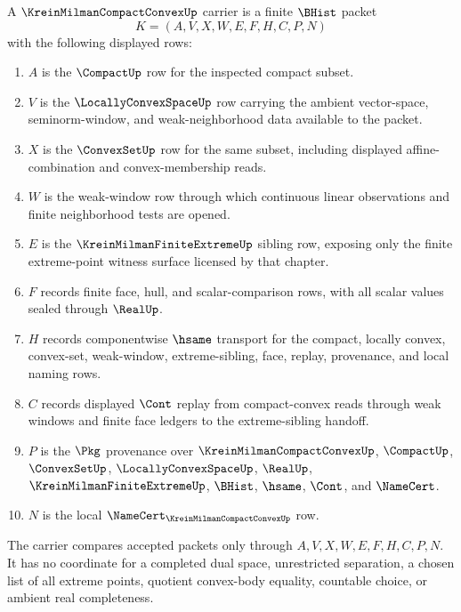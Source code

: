 \begin{definition}
\label{def:krein-milman-compact-convex-carrier}
A $\KreinMilmanCompactConvexUp$ carrier is a finite $\BHist$ packet
$$
K=(A,V,X,W,E,F,H,C,P,N)
$$
with the following displayed rows:
\begin{enumerate}
\item $A$ is the $\CompactUp$ row for the inspected compact subset.
\item $V$ is the $\LocallyConvexSpaceUp$ row carrying the ambient vector-space, seminorm-window, and weak-neighborhood data available to the packet.
\item $X$ is the $\ConvexSetUp$ row for the same subset, including displayed affine-combination and convex-membership reads.
\item $W$ is the weak-window row through which continuous linear observations and finite neighborhood tests are opened.
\item $E$ is the $\KreinMilmanFiniteExtremeUp$ sibling row, exposing only the finite extreme-point witness surface licensed by that chapter.
\item $F$ records finite face, hull, and scalar-comparison rows, with all scalar values sealed through $\RealUp$.
\item $H$ records componentwise $\hsame$ transport for the compact, locally convex, convex-set, weak-window, extreme-sibling, face, replay, provenance, and local naming rows.
\item $C$ records displayed $\Cont$ replay from compact-convex reads through weak windows and finite face ledgers to the extreme-sibling handoff.
\item $P$ is the $\Pkg$ provenance over $\KreinMilmanCompactConvexUp$, $\CompactUp$, $\ConvexSetUp$, $\LocallyConvexSpaceUp$, $\RealUp$, $\KreinMilmanFiniteExtremeUp$, $\BHist$, $\hsame$, $\Cont$, and $\NameCert$.
\item $N$ is the local $\NameCert_{\KreinMilmanCompactConvexUp}$ row.
\end{enumerate}
The carrier compares accepted packets only through $A,V,X,W,E,F,H,C,P,N$. It has no coordinate for a completed dual space, unrestricted separation, a chosen list of all extreme points, quotient convex-body equality, countable choice, or ambient real completeness.
\end{definition}


